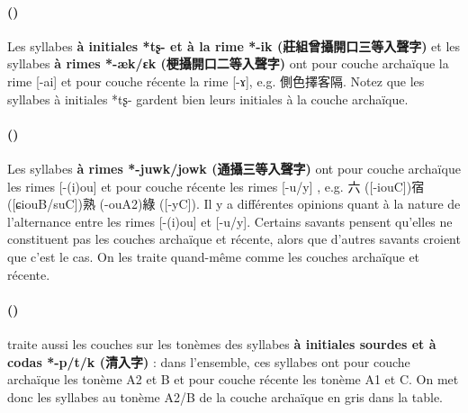 \documentclass{scrbook}
\newcounter{c}[subsubsection]
\newcommand{\stpc}[1]{\stepcounter{#1}}
\newcommand{\difwenbai}{couches archaïque et récente\xspace}
\newcommand{\termyyx}[1]{\textbf{#1}}
\begin{document}
\begin{sloppypar}
\stpc{c}\paragraph{()}
Les syllabes \termyyx{à initiales *tʂ- et à la rime *-ik (莊組曾攝開口三等入聲字)} et les syllabes \termyyx{à rimes *-æk/ɛk (梗攝開口二等入聲字)} ont pour couche archaïque la rime [-ai] et pour couche récente la rime [-ɤ], e.g. 側色擇客隔. Notez que les syllabes à initiales *tʂ- gardent bien leurs initiales à la couche archaïque.

\stpc{c}\paragraph{()}
Les syllabes \termyyx{à rimes *-juwk/jowk (通攝三等入聲字)} ont pour couche archaïque les rimes [-(i)ou] et pour couche récente les rimes [-u/y] , e.g. 六 ([-iouC])宿 ([ɕiouB/suC])熟 (-ouA2)綠 ([-yC]). Il y a différentes opinions quant à la nature de l'alternance entre les rimes [-(i)ou] et [-u/y]. Certains savants pensent qu'elles ne constituent pas les \difwenbai, alors que d'autres savants croient que c'est le cas. On les traite quand-même comme les \difwenbai.

\stpc{c}\paragraph{()}
\textcite[215]{Zhang2010beijing} traite aussi les couches sur les tonèmes des syllabes \termyyx{à initiales sourdes et à codas *-p/t/k (清入字)} : dans l'ensemble, ces syllabes ont pour couche archaïque les tonème A2 et B et pour couche récente les tonème A1 et C. On met donc les syllabes au tonème A2/B de la couche archaïque en gris dans la table.


\end{sloppypar}
\end{document}
